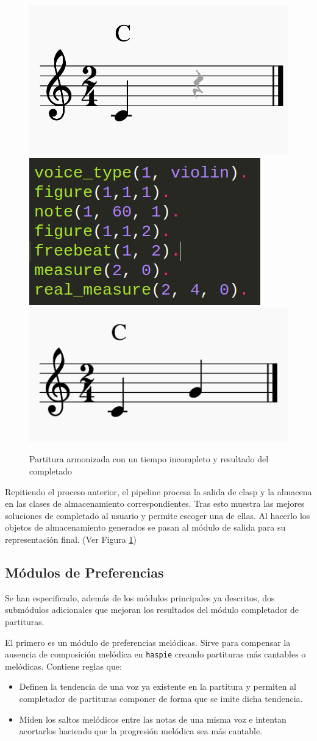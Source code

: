 \begin{figure}[h]
	\centering
	\includegraphics[width=0.35\linewidth,valign=c]{imagenes/incomplete_score.png}
	\includegraphics[width=0.3\linewidth,valign=c]{imagenes/incomplete_facts.png}
	\includegraphics[width=0.35\linewidth]{imagenes/completed_score.png}
	\caption{Partitura armonizada con un tiempo incompleto y resultado del completado}
	\label{fig:simple-piece-complete}
\end{figure}

Repitiendo el proceso anterior, el pipeline procesa la salida de clasp y la almacena en las clases de almacenamiento correspondientes. Tras esto muestra las mejores soluciones de completado al usuario y permite escoger una de ellas. Al hacerlo los objetos de almacenamiento generados se pasan al módulo de salida para su representación final. (Ver Figura \ref{fig:simple-piece-complete})

\subsection{Módulos de Preferencias}
Se han especificado, además de los módulos principales ya descritos, dos submódulos adicionales que mejoran los resultados del módulo completador de partituras.

El primero es un módulo de preferencias melódicas. Sirve para compensar la ausencia de composición melódica en \texttt{haspie} creando partituras más cantables o melódicas. Contiene reglas que:
\begin{itemize}
	\item Definen la tendencia de una voz ya existente en la partitura y permiten al completador de partituras componer de forma que se imite dicha tendencia.
	\item Miden los saltos melódicos entre las notas de una misma voz e intentan acortarlos haciendo que la progresión melódica sea más cantable.
\end{itemize}

